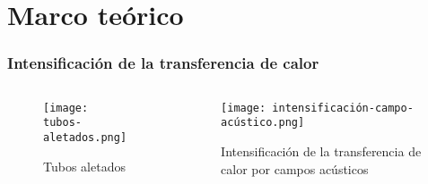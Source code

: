 \section{Marco teórico}

\begin{frame}
    \frametitle{Intensificación de la transferencia de calor}
    \begin{columns}
        \begin{column}{0.6\textwidth}
            \begin{figure}
                \centering
                \texttt{[image: tubos-aletados.png]}
                \caption{Tubos aletados}
            \end{figure}	
            
            {\tiny{}}
        \end{column}
        \begin{column}{0.4\textwidth}
            \begin{figure}
                \centering
                \texttt{[image: intensificación-campo-acústico.png]}
                \caption{Intensificación de la transferencia de calor por campos acústicos}
            \end{figure}	
        \end{column}
    \end{columns}
\end{frame}

